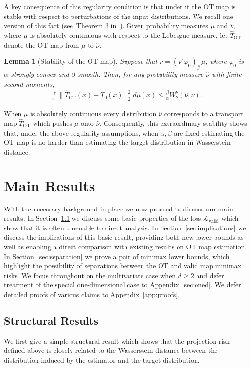 \documentclass[11pt,twoside]{article}
\newcommand{\lvalid}{\mathcal{L}_{\text{valid}}}
\newtheorem{lemma}{Lemma}
\newcommand{\OT}{\mathrm{OT}}
\begin{document}
A key consequence of this regularity condition is that under it the OT map is stable with respect to perturbations of the input distributions. We recall one version of this fact (see~Theorem 3 in~\cite{balakrishnan2026stability}). Given probability measures $\mu$ and $\widehat{\nu}$, where $\mu$ is absolutely continuous with respect to the Lebesgue measure, let $\widehat{T}_{\OT}$ denote 
the OT map from $\mu$ to $\widehat{\nu}$.
\begin{lemma}[Stability of the OT map]
\label{lem:ot-stability}
Suppose that $\nu = (\nabla \varphi_0)_{\#}\mu$, where $\varphi_0$ is $\alpha$-strongly convex and $\beta$-smooth. Then, for any probability measure $\widehat{\nu}$ with finite second moments,
\begin{align*}
\int \|\widehat{T}_{\OT}(x)-T_0(x)\|_2^2 d\mu(x)
\leq \frac{\beta}{\alpha} W^2_2(\widehat{\nu},\nu).
\end{align*}
\end{lemma}

\noindent When $\mu$ is absolutely continuous every distribution $\widehat{\nu}$ corresponds to a transport map $\widehat{T}_{\OT}$ which pushes $\mu$ onto $\widehat{\nu}$. Consequently, this extraordinary stability shows that, under the above regularity assumptions, when $\alpha, \beta$ are fixed estimating the OT map is no harder than estimating the target distribution in Wasserstein distance.

\section{Main Results}
With the necessary background in place we now proceed to discuss our main results. In Section~\ref{sec:structural} we discuss some basic properties of the loss $\lvalid$ which show that it is often amenable to direct analysis. In Section~\ref{sec:implications} we discuss the implications of this basic result, providing both new lower bounds as well as enabling a direct comparison with existing results on OT map estimation. 
In Section~\ref{sec:separation} we prove a pair of minimax lower bounds, which highlight the possibility of separations between the OT and valid map minimax risks. We focus throughout on the multivariate case when $d \geq 2$ and defer treatment of the special one-dimensional case to Appendix~\ref{sec:oned}. We defer detailed proofs of various
claims to Appendix~\ref{app:proofs}.

\subsection{Structural Results}
\label{sec:structural}
We first give a simple structural result which shows that the projection risk defined above is closely related to the Wasserstein distance between the distribution induced by the estimator and the target distribution.
\end{document}
